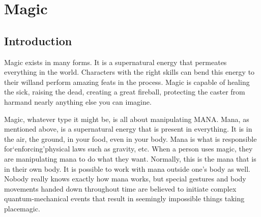 \documentclass[twoside]{book}
\begin{document}
\begin{multicols}{2}
    


\hspace{-2ex}
\vspace{1ex}


    


\hspace{-2ex}
\vspace{1ex}


    


\hspace{-2ex}
\vspace{1ex}


    


\hspace{-2ex}
\vspace{1ex}


    
\end{multicols}
  
    

\chapter{Magic}
    
    

\section{Introduction}
    
    {  
    Magic exists in many forms. It is a supernatural energy that permeates everything in the world. Characters with the right skills can bend this energy to their willand perform amazing feats in the process. Magic is capable of healing the sick, raising the dead, creating a great fireball, protecting the caster from harmand nearly anything else you can imagine.
    }
  
    {  
    Magic, whatever type it might be, is all about manipulating MANA. Mana, as mentioned above, is a supernatural energy that is present in everything. It is in the air, the ground, in your food, even in your body. Mana is what is responsible for`enforcing'physical laws such as gravity, etc. When a person uses magic, they are manipulating mana to do what they want. Normally, this is the mana that is in their own body. It is possible to work with mana outside one's body as well. Nobody really knows exactly how mana works, but special gestures and body movements handed down throughout time are believed to initiate complex quantum-mechanical events that result in seemingly impossible things taking placemagic.
    }
  
\end{document}
